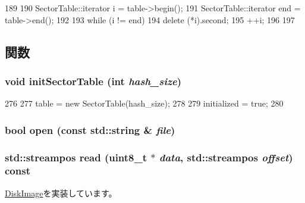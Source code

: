 \begin{DoxyCode}
189 {
190     SectorTable::iterator i = table->begin();
191     SectorTable::iterator end = table->end();
192 
193     while (i != end) {
194         delete (*i).second;
195         ++i;
196     }
197 }
\end{DoxyCode}


\subsection{関数}
\hypertarget{classCowDiskImage_a68d4538305e2037525db5bdbb9e8881e}{
\subsubsection[{initSectorTable}]{\setlength{\rightskip}{0pt plus 5cm}void initSectorTable (int {\em hash\_\-size})}}
\label{classCowDiskImage_a68d4538305e2037525db5bdbb9e8881e}



\begin{DoxyCode}
276 {
277     table = new SectorTable(hash_size);
278 
279     initialized = true;
280 }
\end{DoxyCode}
\hypertarget{classCowDiskImage_a5acc5a46099815559b3081f2fa5c3464}{
\subsubsection[{open}]{\setlength{\rightskip}{0pt plus 5cm}bool open (const std::string \& {\em file})}}
\label{classCowDiskImage_a5acc5a46099815559b3081f2fa5c3464}
\hypertarget{classCowDiskImage_ab2e0b5adfb9d2c78b1e534efa2af6e45}{
\subsubsection[{read}]{\setlength{\rightskip}{0pt plus 5cm}std::streampos read (uint8\_\-t $\ast$ {\em data}, \/  std::streampos {\em offset}) const}}
\label{classCowDiskImage_ab2e0b5adfb9d2c78b1e534efa2af6e45}


\hyperlink{classDiskImage_afcf02c1fffcb16ed79ac38bb87fb572c}{DiskImage}を実装しています。


